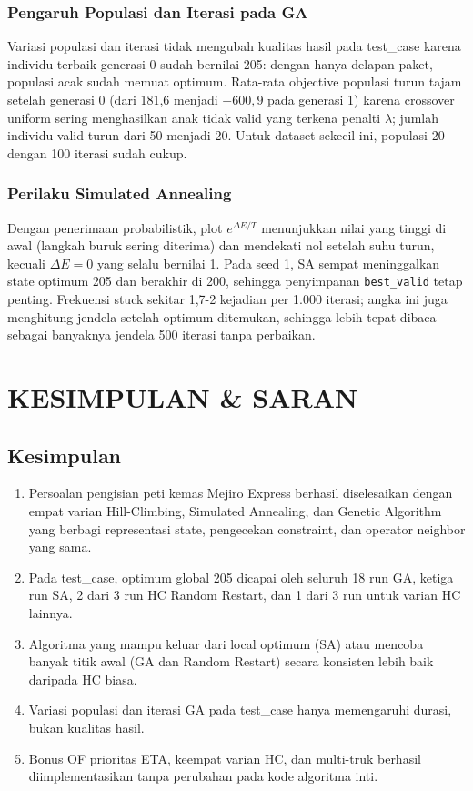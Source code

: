 \documentclass[12pt,a4paper]{report}
\newcommand{\code}[1]{\texttt{\small #1}}
\begin{document}
\subsection{Pengaruh Populasi dan Iterasi pada GA}
Variasi populasi dan iterasi tidak mengubah kualitas hasil pada test\_case karena individu terbaik
generasi 0 sudah bernilai 205: dengan hanya delapan paket, populasi acak sudah memuat optimum.
Rata-rata objective populasi turun tajam setelah generasi 0 (dari 181,6 menjadi $-600{,}9$ pada generasi 1) karena
crossover uniform sering menghasilkan anak tidak valid yang terkena penalti $\lambda$; jumlah
individu valid turun dari 50 menjadi 20. Untuk dataset sekecil ini, populasi 20
dengan 100 iterasi sudah cukup.

\subsection{Perilaku Simulated Annealing}
Dengan penerimaan probabilistik, plot $e^{\Delta E/T}$ menunjukkan nilai yang tinggi di awal
(langkah buruk sering diterima) dan mendekati nol setelah suhu turun, kecuali $\Delta E = 0$ yang
selalu bernilai 1. Pada seed 1, SA sempat meninggalkan state optimum 205 dan berakhir di 200,
sehingga penyimpanan \code{best\_valid} tetap penting. Frekuensi stuck sekitar 1,7-2 kejadian per
1.000 iterasi; angka ini juga menghitung jendela setelah optimum ditemukan, sehingga lebih tepat
dibaca sebagai banyaknya jendela 500 iterasi tanpa perbaikan.

\chapter{KESIMPULAN \& SARAN}

\section{Kesimpulan}
\begin{enumerate}[leftmargin=1.5cm]
  \item Persoalan pengisian peti kemas Mejiro Express berhasil diselesaikan dengan empat varian Hill-Climbing, Simulated Annealing, dan Genetic Algorithm yang berbagi representasi state, pengecekan constraint, dan operator neighbor yang sama.
  \item Pada test\_case, optimum global 205 dicapai oleh seluruh 18 run GA, ketiga run SA, 2 dari 3 run HC Random Restart, dan 1 dari 3 run untuk varian HC lainnya.
  \item Algoritma yang mampu keluar dari local optimum (SA) atau mencoba banyak titik awal (GA dan Random Restart) secara konsisten lebih baik daripada HC biasa.
  \item Variasi populasi dan iterasi GA pada test\_case hanya memengaruhi durasi, bukan kualitas hasil.
  \item Bonus OF prioritas ETA, keempat varian HC, dan multi-truk berhasil diimplementasikan tanpa perubahan pada kode algoritma inti.
\end{enumerate}
\end{document}
